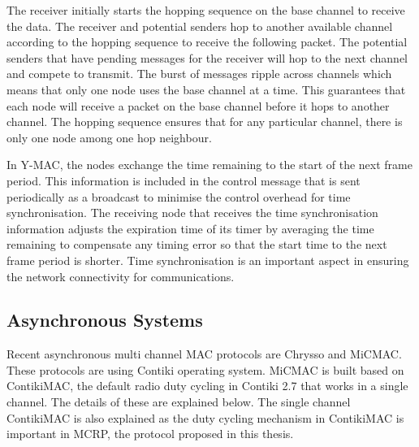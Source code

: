 The receiver initially starts the hopping sequence on the base channel to receive the data. The receiver and potential senders hop to another available channel according to the hopping sequence to receive the following packet. The potential senders that have pending messages for the receiver will hop to the next channel and compete to transmit. The burst of messages ripple across channels which means that only one node uses the base channel at a time. This guarantees that each node will receive a packet on the base channel before it hops to another channel. The hopping sequence ensures that for any particular channel, there is only one node among one hop neighbour.

In Y-MAC, the nodes exchange the time remaining to the start of the next frame period. This information is included in the control message that is sent periodically as a broadcast to minimise the control overhead for time synchronisation. The receiving node that receives the time synchronisation information adjusts the expiration time of its timer by averaging the time remaining to compensate any timing error so that the start time to the next frame period is shorter. Time synchronisation is an important aspect in ensuring the network connectivity for communications.

 



\subsection{Asynchronous Systems}
Recent asynchronous multi channel MAC protocols are Chrysso and MiCMAC. These protocols are using Contiki operating system. MiCMAC is built based on ContikiMAC, the default radio duty cycling in Contiki 2.7 that works in a single channel. The details of these are explained below. The single channel ContikiMAC is also explained as the duty cycling mechanism in ContikiMAC is important in MCRP, the protocol proposed in this thesis.

